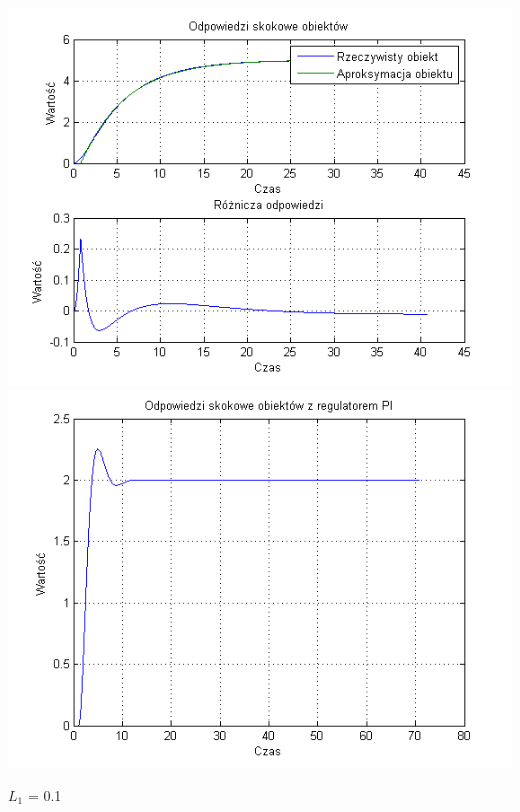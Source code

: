 \documentclass[10pt,a4paper]{article}
\begin{document}
\begin{center}
\includegraphics[scale=1]{images/jeden/skrypt_193.png}\\
\includegraphics[scale=1]{images/jeden/skrypt_194.png}\\
\end{center}
\newpage
$L_1$ = 0.1
\end{document}
